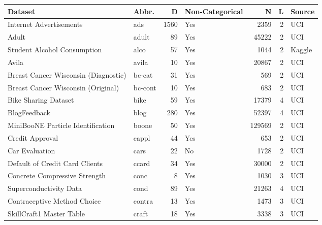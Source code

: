 \begin{tabular}{llrlrrl}
\toprule
                                           Dataset &   Abbr. &    D & Non-Categorical &      N &  L & Source \\
\midrule
                           Internet Advertisements &     ads & 1560 &             Yes &   2359 &  2 &    UCI \\
                                             Adult &   adult &   89 &             Yes &  45222 &  2 &    UCI \\
                       Student Alcohol Consumption &    alco &   57 &             Yes &   1044 &  2 & Kaggle \\
                                             Avila &   avila &   10 &             Yes &  20867 &  2 &    UCI \\
              Breast Cancer Wisconsin (Diagnostic) &  bc-cat &   31 &             Yes &    569 &  2 &    UCI \\
                Breast Cancer Wisconsin (Original) & bc-cont &   10 &             Yes &    683 &  2 &    UCI \\
                              Bike Sharing Dataset &    bike &   59 &             Yes &  17379 &  4 &    UCI \\
                                      BlogFeedback &    blog &  280 &             Yes &  52397 &  4 &    UCI \\
                 MiniBooNE Particle Identification &   boone &   50 &             Yes & 129569 &  2 &    UCI \\
                                   Credit Approval &   cappl &   44 &             Yes &    653 &  2 &    UCI \\
                                    Car Evaluation &    cars &   22 &              No &   1728 &  2 &    UCI \\
                    Default of Credit Card Clients &   ccard &   34 &             Yes &  30000 &  2 &    UCI \\
                     Concrete Compressive Strength &    conc &    8 &             Yes &   1030 &  3 &    UCI \\
                            Superconductivity Data &    cond &   89 &             Yes &  21263 &  4 &    UCI \\
                       Contraceptive Method Choice &  contra &   13 &             Yes &   1473 &  3 &    UCI \\
                          SkillCraft1 Master Table &   craft &   18 &             Yes &   3338 &  3 &    UCI \\

\end{tabular}
